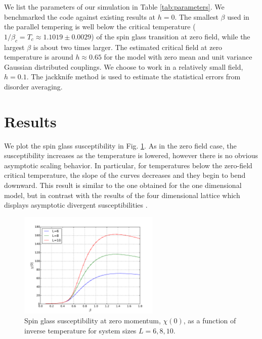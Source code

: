 We list the parameters of our simulation in Table \ref{tab:parameters}. We 
benchmarked the code against existing results at $h=0$.  The smallest 
$\beta$ used in the parallel tempering is well below the critical temperature ($1/\beta_{c} = T_{c} \approx 1.1019 \pm 0.0029$) \cite{Baity-Jesi-etal-2013} of 
the spin glass transition at zero field\cite{Ballesteros2000,Baity-Jesi-etal-2013}, while the largest $\beta$ 
is about two times larger.  The estimated critical field at zero temperature is around $h \approx 0.65$ for 
the model with zero mean and unit variance Gaussian distributed couplings\cite{Krzakala-etal-2001}. 
We choose to work in a relatively small field, $h=0.1$. 
The jackknife method is used to estimate the statistical errors from disorder averaging. 



\section{Results} 
We plot the spin glass susceptibility in Fig. \ref{fig:Chi}. As in the 
zero field case, the susceptibility increases as the temperature is lowered, however there is
no obvious asymptotic scaling behavior. In particular, for temperatures below  
the zero-field critical temperature, the
slope of the curves decreases and they begin to bend downward. This result is similar to the one obtained for
the one dimensional model\cite{Larson-etal-2013}, but in contrast with the results of the four dimensional lattice 
which displays asymptotic divergent susceptibilities \cite{Marinari-etal-1998}.

\begin{figure}[ht]
\centering
  \includegraphics[width=0.6\textwidth]{img/chi.pdf}%
  \caption{\label{fig:Chi} Spin glass susceptibility at zero momentum, $\chi(0)$, as a function of inverse temperature 
for system sizes $L=6,8,10$.}
\end{figure}


